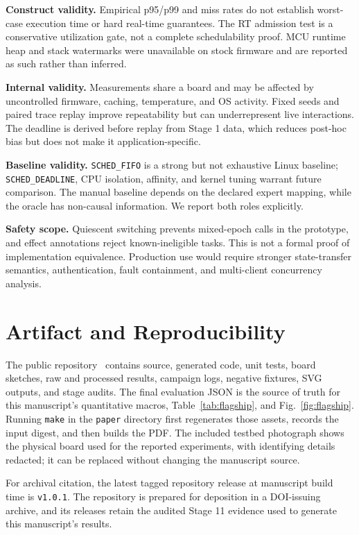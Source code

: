 \documentclass[conference]{IEEEtran}
\begin{document}
\textbf{Construct validity.} Empirical p95/p99 and miss rates do not establish
worst-case execution time or hard real-time guarantees. The RT admission test
is a conservative utilization gate, not a complete schedulability proof. MCU
runtime heap and stack watermarks were unavailable on stock firmware and are
reported as such rather than inferred.

\textbf{Internal validity.} Measurements share a board and may be affected by
uncontrolled firmware, caching, temperature, and OS activity. Fixed seeds and
paired trace replay improve repeatability but can underrepresent live
interactions. The deadline is derived before replay from Stage 1 data, which
reduces post-hoc bias but does not make it application-specific.

\textbf{Baseline validity.} \texttt{SCHED\_FIFO} is a strong but not exhaustive
Linux baseline; \texttt{SCHED\_DEADLINE}, CPU isolation, affinity, and kernel
tuning warrant future comparison. The manual baseline depends on the declared
expert mapping, while the oracle has non-causal information. We report both
roles explicitly.

\textbf{Safety scope.} Quiescent switching prevents mixed-epoch calls in the
prototype, and effect annotations reject known-ineligible tasks. This is not a
formal proof of implementation equivalence. Production use would require
stronger state-transfer semantics, authentication, fault containment, and
multi-client concurrency analysis.

\section{Artifact and Reproducibility}
The public repository~\cite{qfabric2026} contains source, generated code, unit
tests, board sketches, raw and processed results, campaign logs, negative
fixtures, SVG outputs, and stage audits. The final evaluation JSON is the source
of truth for this manuscript's quantitative macros, Table~\ref{tab:flagship},
and Fig.~\ref{fig:flagship}. Running
\texttt{make} in the \texttt{paper} directory first regenerates those assets,
records the input digest, and then builds the PDF. The included testbed
photograph shows the physical board used for the reported experiments, with
identifying details redacted; it can be replaced without changing the
manuscript source.

For archival citation, the latest tagged repository release at manuscript build
time is \texttt{v1.0.1}. The repository is prepared for deposition in a
DOI-issuing archive, and its releases retain the audited Stage 11 evidence used
to generate this manuscript's results.
\end{document}
